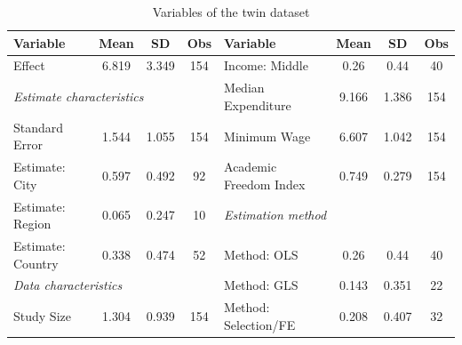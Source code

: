 \begin{table}[!htbp]
  \centering
  \scriptsize
  \singlespace
  \caption{Variables of the twin dataset}
  \label{tab:twins_new_vars}
  \begin{tabular}
    {
      @{\hskip\tabcolsep\extracolsep}
      l
      *{3}{c}
      |
      l
        *{3}{c}
      @{}
    }
    \toprule
    Variable                                                                & Mean   & SD                  & Obs   & Variable                                                               & Mean  & SD    & Obs \\
    \midrule
    Effect                                                                  & 6.819  & 3.349               & 154   & Income: Middle                                                         & 0.26  & 0.44  & 40  \\
    \multicolumn{3}{l}{\textit{\hspace{0.1cm}Estimate characteristics}}     &        & Median Expenditure  & 9.166 & 1.386                                                                  & 154                 \\
    Standard Error                                                          & 1.544  & 1.055               & 154   & Minimum Wage                                                           & 6.607 & 1.042 & 154 \\
    Estimate: City                                                          & 0.597  & 0.492               & 92    & Academic Freedom Index                                                 & 0.749 & 0.279 & 154 \\
    Estimate: Region                                                        & 0.065  & 0.247               & 10    & \multicolumn{3}{l}{\textit{\hspace{0.1cm}Estimation method}}           &                     \\
    Estimate: Country                                                       & 0.338  & 0.474               & 52    & Method: OLS                                                            & 0.26  & 0.44  & 40  \\
    \multicolumn{3}{l}{\textit{\hspace{0.1cm}Data characteristics}}         &        & Method: GLS         & 0.143 & 0.351                                                                  & 22                  \\
    Study Size                                                              & 1.304  & 0.939               & 154   & Method: Selection/FE                                                   & 0.208 & 0.407 & 32  \\

\end{tabular}
\end{table}
